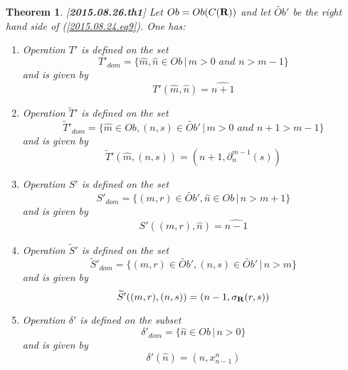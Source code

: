\documentclass[11pt]{article}
\newtheorem{theorem}[proposition]{Theorem}
\newcommand{\llabel}[1]{\label{#1}[{\bf #1}]}
\newcommand{\rr}{{\bf R}}
\newcommand{\wt}{\widetilde}
\newcommand{\wh}{\widehat}
\begin{document}
\begin{theorem}
\llabel{2015.08.26.th1}
Let $Ob=Ob(C(\rr))$ and let $\wt{Ob}'$ be the right hand side of (\ref{2015.08.24.eq9}). One has:
%
\begin{enumerate}
\item Operation $T'$ is defined on the set
%
$$T'_{dom}=\{\wh{m},\wh{n}\in Ob\,|\,m>0\,\,and\,\,n>m-1\}$$
%
and is given by 
%
$$T'(\wh{m},\wh{n})=\wh{n+1}$$
%
\item Operation $\wt{T}'$ is defined on the set 
%
$$\wt{T}'_{dom}=\{\wh{m}\in Ob, (n,s)\in \wt{Ob}'\,|\,m>0\,\,and\,\,n+1>m-1\}$$
%
and is given by
%
$$\wt{T}'(\wh{m},(n,s))=(n+1,\partial_n^{m-1}(s))$$
%
\item Operation $S'$ is defined on the set
%
$$S'_{dom}=\{(m,r)\in \wt{Ob}',\wh{n}\in Ob\,|\,n>m+1\}$$
%
and is given by
%
$$S'((m,r),\wh{n})=\wh{n-1}$$
%
\item Operation $\wt{S}'$ is defined on the set 
%
$$\wt{S}'_{dom}=\{(m,r)\in\wt{Ob}',(n,s)\in \wt{Ob}'\,|\,n>m\}$$
%
and is given by
%
$$\wt{S}'((m,r),(n,s))=(n-1,\sigma_{\rr}(r,s))$$
%
\item Operation $\delta'$ is defined on the subset
%
$$\delta'_{dom}=\{\wh{n}\in Ob\,|\,n>0\}$$
%
and is given by
%
$$\delta'(\wh{n})=(n,x_{n-1}^n)$$
%
\end{enumerate}
\end{theorem}
%
\end{document}
